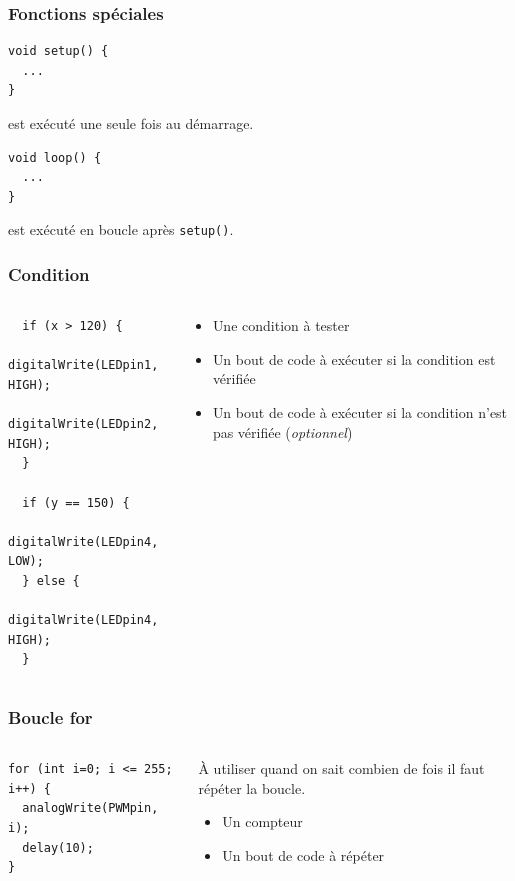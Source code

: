 \documentclass[aspectratio=169,utf8,french]{beamer}
\begin{document}
\begin{frame}[fragile]
  \frametitle{Fonctions spéciales}
  \begin{lstlisting}
void setup() {
  ...
}
  \end{lstlisting}
  est exécuté une seule fois au démarrage.

  \begin{lstlisting}[firstnumber=4]
void loop() {
  ...
}
  \end{lstlisting}
  est exécuté en boucle après \lstinline|setup()|.
\end{frame}

\begin{frame}[fragile]
  \frametitle{Condition}
  \begin{columns}
    \begin{column}{.5\textwidth}
      \begin{lstlisting}
  if (x > 120) {
    digitalWrite(LEDpin1, HIGH);
    digitalWrite(LEDpin2, HIGH);
  }
  
  if (y == 150) {
    digitalWrite(LEDpin4, LOW);
  } else {
    digitalWrite(LEDpin4, HIGH);
  }
      \end{lstlisting}
    \end{column}
    \begin{column}{.5\textwidth}
      \begin{itemize}
        \item Une condition à tester
        \item Un bout de code à exécuter si la condition est vérifiée
        \item Un bout de code à exécuter si la condition n’est pas vérifiée (\emph{optionnel})
      \end{itemize}
    \end{column}
  \end{columns}
\end{frame}

\begin{frame}[fragile]
  \frametitle{Boucle for}
  \begin{columns}
    \begin{column}{.5\textwidth}
      \begin{lstlisting}
for (int i=0; i <= 255; i++) {
  analogWrite(PWMpin, i);
  delay(10);
}
      \end{lstlisting}
    \end{column}
    \begin{column}{.5\textwidth}
      À utiliser quand on sait combien de fois il faut répéter la boucle.
      \begin{itemize}
        \item Un compteur
        \item Un bout de code à répéter
      \end{itemize}
    \end{column}
  \end{columns}
\end{frame}
\end{document}
